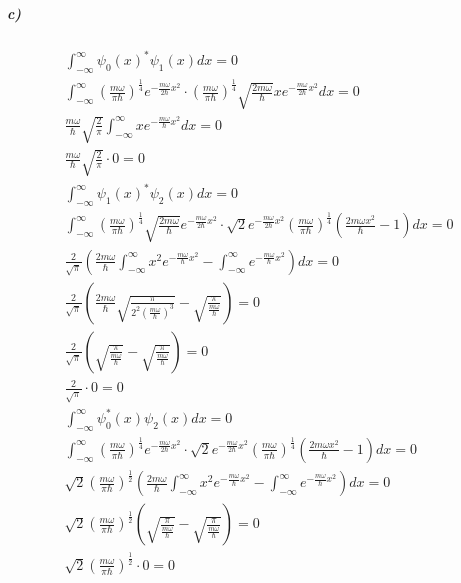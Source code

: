 \documentclass[11pt, A4paper,norsk]{article}
\begin{document}
			\subparagraph{c)}
				\begin{gather*}
\int_{- \infty}^{\infty} \psi_0(x)^{*} \psi_1(x) dx = 0 \\
\int_{- \infty}^{\infty} \left( \frac{m \omega}{\pi \hbar} \right)^{\frac{1}{4}} e^{- \frac{m \omega}{2 \hbar} x^2} \cdot \left( \frac{m \omega}{\pi \hbar} \right)^{\frac{1}{4}} \sqrt{\frac{2 m \omega}{\hbar}} x e^{- \frac{m \omega}{2 \hbar} x^2} dx = 0 \\
\frac{m \omega}{\hbar} \sqrt{\frac{2}{\pi}} \int_{- \infty}^{\infty} x e^{- \frac{m \omega}{\hbar} x^2} dx = 0 \\
\frac{m \omega}{\hbar} \sqrt{\frac{2}{\pi}} \cdot 0 = 0 \\
\int_{- \infty}^{\infty} \psi_1(x)^{*} \psi_2(x) dx = 0 \\
\int_{- \infty}^{\infty} \left( \frac{m \omega}{\pi \hbar} \right)^{\frac{1}{4}} \sqrt{\frac{2 m \omega}{\hbar}} e^{- \frac{m \omega}{2 \hbar} x^2} \cdot \sqrt{2} e^{- \frac{m \omega}{2 \hbar} x^2} \left( \frac{m \omega}{\pi \hbar} \right)^{\frac{1}{4}} \left( \frac{2 m \omega x^2}{\hbar} - 1 \right) dx = 0 \\
\frac{2}{\sqrt{\pi}} \left( \frac{2 m \omega}{\hbar} \int_{- \infty}^{\infty} x^2 e^{- \frac{m \omega}{\hbar} x^2} - \int_{- \infty}^{\infty} e^{- \frac{m \omega}{\hbar} x^2} \right) dx = 0 \\
\frac{2}{\sqrt{\pi}} \left( \frac{2 m \omega}{\hbar} \sqrt{\frac{\pi}{2^2 \left( \frac{m \omega}{\hbar} \right)^{3}}} - \sqrt{\frac{\pi}{\frac{m \omega}{\hbar}}} \right) = 0 \\
\frac{2}{\sqrt{\pi}} \left( \sqrt{\frac{\pi}{\frac{m \omega}{\hbar}}} - \sqrt{\frac{\pi}{\frac{m \omega}{\hbar}}} \right) = 0 \\
\frac{2}{\sqrt{\pi}} \cdot 0 = 0 \\
\int_{- \infty}^{\infty} \psi_0^{*}(x) \psi_2(x) dx = 0 \\
\int_{- \infty}^{\infty} \left( \frac{m \omega}{\pi \hbar} \right)^{\frac{1}{4}} e^{- \frac{m \omega}{2 \hbar} x^2} \cdot \sqrt{2} e^{- \frac{m \omega}{2 \hbar} x^2} \left( \frac{m \omega}{\pi \hbar} \right)^{\frac{1}{4}} \left( \frac{2 m \omega x^2}{\hbar} - 1 \right) dx = 0 \\
\sqrt{2} \left( \frac{m \omega}{\pi \hbar} \right)^{\frac{1}{2}} \left( \frac{2 m \omega}{\hbar} \int_{- \infty}^{\infty} x^2 e^{- \frac{m \omega}{\hbar} x^2} - \int_{- \infty}^{\infty} e^{- \frac{m \omega}{\hbar} x^2} \right) dx = 0 \\
\sqrt{2} \left( \frac{m \omega}{\pi \hbar} \right)^{\frac{1}{2}} \left( \sqrt{\frac{\pi}{\frac{m \omega}{\hbar}}} - \sqrt{\frac{\pi}{\frac{m \omega}{\hbar}}} \right) = 0 \\
\sqrt{2} \left( \frac{m \omega}{\pi \hbar} \right)^{\frac{1}{2}} \cdot 0 = 0
				\end{gather*}
			
\end{document}
